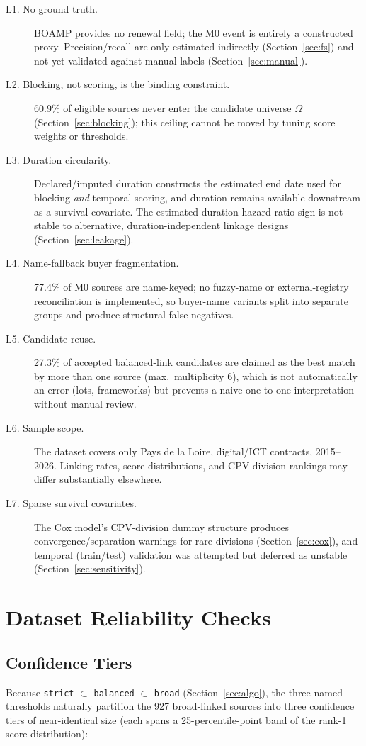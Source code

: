 \documentclass[11pt]{article}
\begin{document}
\begin{description}
\item[L1. No ground truth.] BOAMP provides no renewal field; the M0 event
is entirely a constructed proxy. Precision/recall are only estimated
indirectly (Section~\ref{sec:fs}) and not yet validated against manual
labels (Section~\ref{sec:manual}).
\item[L2. Blocking, not scoring, is the binding constraint.] 60.9\% of
eligible sources never enter the candidate universe $\Omega$
(Section~\ref{sec:blocking}); this ceiling cannot be moved by tuning score
weights or thresholds.
\item[L3. Duration circularity.] Declared/imputed duration constructs the
estimated end date used for blocking \emph{and} temporal scoring, and
duration remains available downstream as a survival covariate. The
estimated duration hazard-ratio sign is not stable to alternative,
duration-independent linkage designs (Section~\ref{sec:leakage}).
\item[L4. Name-fallback buyer fragmentation.] 77.4\% of M0 sources are
name-keyed; no fuzzy-name or external-registry reconciliation is
implemented, so buyer-name variants split into separate groups and produce
structural false negatives.
\item[L5. Candidate reuse.] 27.3\% of accepted balanced-link candidates are
claimed as the best match by more than one source (max.\ multiplicity 6),
which is not automatically an error (lots, frameworks) but prevents a naive
one-to-one interpretation without manual review.
\item[L6. Sample scope.] The dataset covers only Pays de la Loire,
digital/ICT contracts, 2015--2026. Linking rates, score distributions, and
CPV-division rankings may differ substantially elsewhere.
\item[L7. Sparse survival covariates.] The Cox model's CPV-division dummy
structure produces convergence/separation warnings for rare divisions
(Section~\ref{sec:cox}), and temporal (train/test) validation was attempted
but deferred as unstable (Section~\ref{sec:sensitivity}).
\end{description}

\section{Dataset Reliability Checks}
\label{sec:reliability}

\subsection{Confidence Tiers}
Because \texttt{strict} $\subset$ \texttt{balanced} $\subset$
\texttt{broad} (Section~\ref{sec:algo}), the three named thresholds
naturally partition the 927 broad-linked sources into three confidence
tiers of near-identical size (each spans a 25-percentile-point band of the
rank-1 score distribution):
\end{document}
